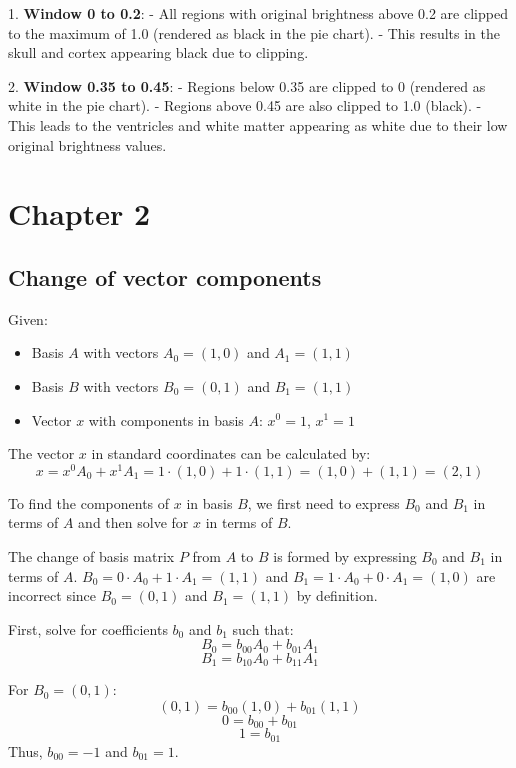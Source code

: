 \documentclass{article}
\begin{document}
1. \textbf{Window 0 to 0.2}: 
   - All regions with original brightness above 0.2 are clipped to the maximum of 1.0 (rendered as black in the pie chart).
   - This results in the skull and cortex appearing black due to clipping.

2. \textbf{Window 0.35 to 0.45}:
   - Regions below 0.35 are clipped to 0 (rendered as white in the pie chart).
   - Regions above 0.45 are also clipped to 1.0 (black).
   - This leads to the ventricles and white matter appearing as white due to their low original brightness values.

\newpage
\section{Chapter 2}
\subsection{Change of vector components}

Given:
\begin{itemize}
    \item Basis \( A \) with vectors \( A_0 = (1, 0) \) and \( A_1 = (1, 1) \)
    \item Basis \( B \) with vectors \( B_0 = (0, 1) \) and \( B_1 = (1, 1) \)
    \item Vector \( x \) with components in basis \( A \): \( x^0 = 1 \), \( x^1 = 1 \)
\end{itemize}

The vector \( x \) in standard coordinates can be calculated by:
\[ x = x^0 A_0 + x^1 A_1 = 1 \cdot (1, 0) + 1 \cdot (1, 1) = (1, 0) + (1, 1) = (2, 1) \]

To find the components of \( x \) in basis \( B \), we first need to express \( B_0 \) and \( B_1 \) in terms of \( A \) and then solve for \( x \) in terms of \( B \).

The change of basis matrix \( P \) from \( A \) to \( B \) is formed by expressing \( B_0 \) and \( B_1 \) in terms of \( A \). \( B_0 = 0 \cdot A_0 + 1 \cdot A_1 = (1, 1) \) and \( B_1 = 1 \cdot A_0 + 0 \cdot A_1 = (1, 0) \) are incorrect since \( B_0 = (0, 1) \) and \( B_1 = (1, 1) \) by definition.

First, solve for coefficients \( b_0 \) and \( b_1 \) such that:
\[ B_0 = b_{00} A_0 + b_{01} A_1 \]
\[ B_1 = b_{10} A_0 + b_{11} A_1 \]

For \( B_0 = (0, 1) \):
\[ (0, 1) = b_{00} (1, 0) + b_{01} (1, 1) \]
\[ 0 = b_{00} + b_{01} \]
\[ 1 = b_{01} \]
Thus, \( b_{00} = -1 \) and \( b_{01} = 1 \).
\end{document}
